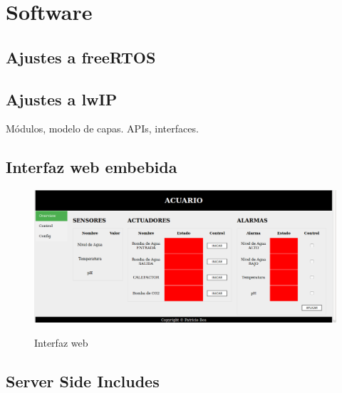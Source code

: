 
\section{Software}



\subsection{Ajustes a freeRTOS}



\subsection{Ajustes a lwIP}

Módulos, modelo de capas. APIs, interfaces.

\subsection{Interfaz web embebida}
\label{sec:interfaz-web}

\begin{figure}[h!]
	\centering
    \includegraphics[width=1\textwidth]{./Figures/interfaz}
	\label{fig:interfaz}
	\caption{Interfaz web}
\end{figure}


\subsection{Server Side Includes}

